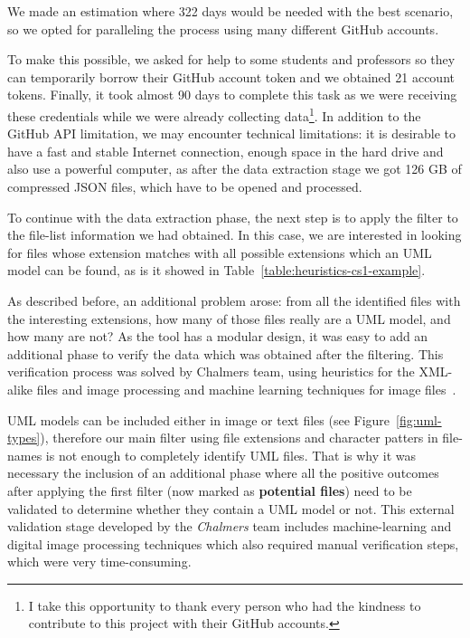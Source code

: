 \documentclass[a4paper, 12pt]{book}
\begin{document}
We made an estimation where 322 days would be needed with the best scenario, so we opted for paralleling the process using many
different GitHub accounts.

To make this possible, we asked for help to some students and professors so they can temporarily borrow their GitHub account
token and we obtained 21 account tokens. Finally, it took almost 90 days to complete this task as we were receiving these credentials
while we were already collecting data\footnote{I take this opportunity to thank every person who had the kindness to contribute to this project
with their GitHub accounts.}.
In addition to the GitHub API limitation, we may encounter technical limitations: it is desirable to have a fast and stable Internet
connection, enough space in the hard drive and also use a powerful computer, as after the data extraction stage we got 126 GB of compressed
JSON files, which have to be opened and processed.

To continue with the data extraction phase, the next step is to apply the filter to the file-list information
we had obtained. In this case, we are interested in looking for files whose extension matches with all possible extensions which an
UML model can be found, as is it showed in Table~\ref{table:heuristics-cs1-example}.

As described before, an additional problem arose: from all the identified files with the interesting extensions, how many of those files
really are a UML model, and how many are not? As the tool has a modular design, it was easy to add an additional phase to verify the data
which was obtained after the filtering. This verification process was solved by Chalmers team, using heuristics for the XML-alike files
and image processing and machine learning techniques for image files~\cite{hoquang2014}.

UML models can be included either in image or text files (see Figure~\ref{fig:uml-types}), therefore our main filter using file extensions
and character patters in file-names is not enough to completely identify UML files. That is why it was necessary the inclusion of
an additional phase where all the positive outcomes after applying the first filter (now marked as \textbf{potential files}) need
to be validated to determine whether they contain a UML model or not. This external validation stage developed by the \emph{Chalmers} team
includes machine-learning and digital image processing techniques which also required manual verification steps, which were very time-consuming.
\end{document}
